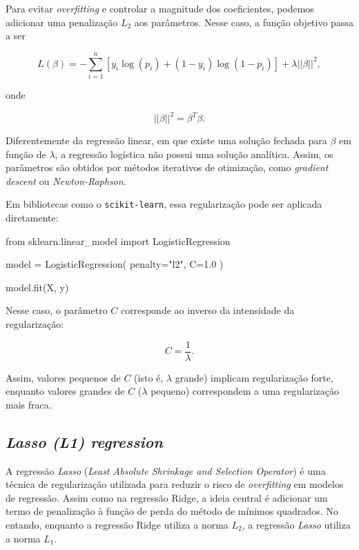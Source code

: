 \documentclass{article}
\begin{document}
Para evitar \textit{overfitting} e controlar a magnitude dos coeficientes,
podemos adicionar uma penalização $L_2$ aos parâmetros. Nesse caso,
a função objetivo passa a ser

\begin{equation*}
    L(\beta) =-\sum_{i = 1}^{n}\left[y_i \log(p_i) + (1 - y_i)\log(1 - p_i)\right] + \lambda ||\beta||^2,
\end{equation*}

onde

\begin{equation*}
    ||\beta||^2 = \beta^T \beta.
\end{equation*}

Diferentemente da regressão linear, em que existe uma solução fechada
para $\beta$ em função de $\lambda$, a regressão logística não possui
uma solução analítica. Assim, os parâmetros são obtidos por métodos
iterativos de otimização, como \textit{gradient descent} ou
\textit{Newton-Raphson}.

Em bibliotecas como o \texttt{scikit-learn}, essa regularização pode ser
aplicada diretamente:

\begin{pythoncode}
from sklearn.linear_model import LogisticRegression

model = LogisticRegression(
    penalty="l2",
    C=1.0
)

model.fit(X, y)
\end{pythoncode}

Nesse caso, o parâmetro $C$ corresponde ao inverso da intensidade da
regularização:

\begin{equation*}
    C = \frac{1}{\lambda}.
\end{equation*}

Assim, valores pequenos de $C$ (isto é, $\lambda$ grande) implicam
regularização forte, enquanto valores grandes de $C$ ($\lambda$ pequeno) 
correspondem a uma regularização mais fraca.

\subsection{\textit{Lasso (L1) regression}}

A regressão \textit{Lasso} (\textit{Least Absolute Shrinkage and Selection Operator})
é uma técnica de regularização utilizada para reduzir o risco de 
\textit{overfitting} em modelos de regressão. Assim como na regressão
Ridge, a ideia central é adicionar um termo de penalização à função 
de perda do método de mínimos quadrados. No entando, enquanto a regressão 
Ridge utiliza a norma $L_2$, a regressão \textit{Lasso} utiliza a norma
$L_1$.
\end{document}
